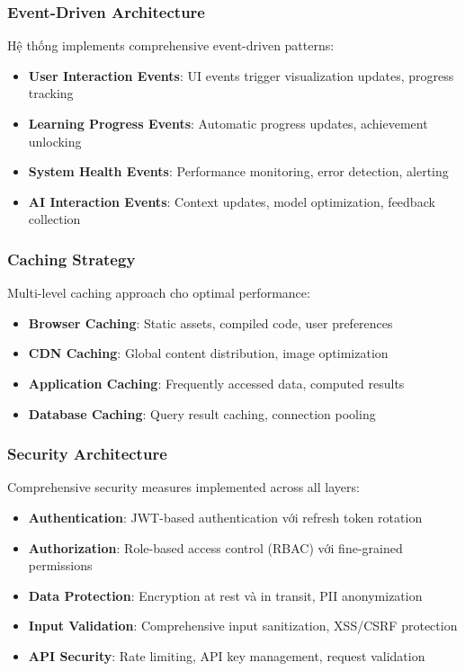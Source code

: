 \subsubsection{Event-Driven Architecture}

Hệ thống implements comprehensive event-driven patterns:

\begin{itemize}
    \item \textbf{User Interaction Events}: UI events trigger visualization updates, progress tracking
    \item \textbf{Learning Progress Events}: Automatic progress updates, achievement unlocking
    \item \textbf{System Health Events}: Performance monitoring, error detection, alerting
    \item \textbf{AI Interaction Events}: Context updates, model optimization, feedback collection
\end{itemize}

\subsubsection{Caching Strategy}

Multi-level caching approach cho optimal performance:

\begin{itemize}
    \item \textbf{Browser Caching}: Static assets, compiled code, user preferences
    \item \textbf{CDN Caching}: Global content distribution, image optimization
    \item \textbf{Application Caching}: Frequently accessed data, computed results
    \item \textbf{Database Caching}: Query result caching, connection pooling
\end{itemize}

\subsubsection{Security Architecture}

Comprehensive security measures implemented across all layers:

\begin{itemize}
    \item \textbf{Authentication}: JWT-based authentication với refresh token rotation
    \item \textbf{Authorization}: Role-based access control (RBAC) với fine-grained permissions
    \item \textbf{Data Protection}: Encryption at rest và in transit, PII anonymization
    \item \textbf{Input Validation}: Comprehensive input sanitization, XSS/CSRF protection
    \item \textbf{API Security}: Rate limiting, API key management, request validation
\end{itemize}

